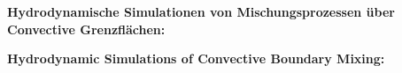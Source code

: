 \thispagestyle{empty}
\begin{center}
  \begin{minipage}[c][0.48\textheight][b]{0.9\textwidth}
    \small
    \textbf{
    Hydrodynamische Simulationen von Mischungsprozessen über Convective Grenzflächen:
    }\par
    \vspace{\baselineskip}
    
  \end{minipage}\par
  \vfill
  \begin{minipage}[c][0.48\textheight][b]{0.9\textwidth}
    \small
    \textbf{
    Hydrodynamic Simulations of Convective Boundary Mixing:
    }\par
    \vspace{\baselineskip}
    
  \end{minipage}
\end{center}
